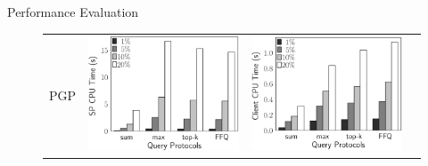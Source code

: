 \documentclass[xcolor={dvipsnames},aspectratio=169,10pt]{beamer}
\begin{document}
\begin{frame}{Performance Evaluation}
  \begin{figure}
    \setlength{\tabcolsep}{0pt}
    \renewcommand{\arraystretch}{0}
    \begin{tabular}{c@{\quad}lll}
      PGP &
      \includegraphics[valign=m,totalheight=\ht\figbox]{exp-figs/aggregate-queries/pgp_sp.eps} &
      \includegraphics[valign=m,totalheight=\ht\figbox]{exp-figs/aggregate-queries/pgp_client.eps} &

\end{tabular}
\end{figure}
\end{frame}
\end{document}
